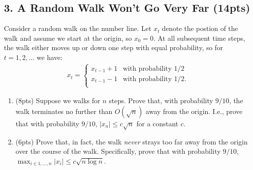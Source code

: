 \documentclass[10pt]{article}
\begin{document}
	
	


\newpage 

\subsection{3. A Random Walk Won't Go Very Far (\textbf {\small 14pts})}
Consider a random walk on the number line. Let $x_t$ denote the postion of the walk and assume we start at the origin, so $x_0 = 0$. At all subsequent time steps, the walk either moves up or down one step with equal probability, so for $t = 1, 2, \ldots$ we have:
\begin{align*}
	x_t = \begin{cases}
		x_{t-1} + 1 & \text{with probability } 1/2 \\
		x_{t-1} - 1 & \text{with probability } 1/2. \\
	\end{cases} 
\end{align*}
\begin{enumerate}[label=(\alph*)]
	\item (8pts) 
	Suppose we walks for $n$ steps. Prove that, with probability $9/10$, the walk terminates no further than $O(\sqrt{n})$ away from the origin. I.e., prove that with probability $9/10$, $|x_n| \leq c\sqrt{n}$ for a constant $c$. 
	\vspace{70em}
	
	
	\item (6pts) Prove that, in fact, the walk \emph{never} strays too far away from the origin over the course of the walk. Specifically, prove that with probability $9/10$, $\max_{i\in 1, \ldots, n} |x_i| \leq c\sqrt{n\log n}$.
\end{enumerate}

\newpage
\end{document}
